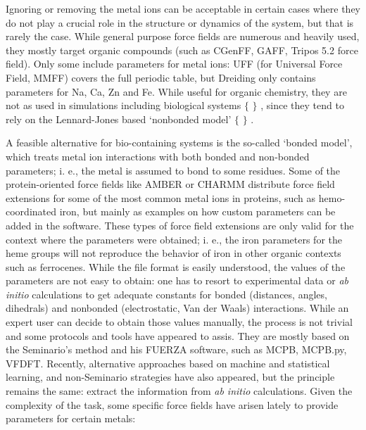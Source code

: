 Ignoring or removing the metal ions can be acceptable in certain cases where they do not play a crucial role in the structure or dynamics of the system, but that is rarely the case. While general purpose force fields are numerous and heavily used, they mostly target organic compounds (such as CGenFF,\cite{Vanommeslaeghe2009} GAFF,\cite{Wang2004} Tripos 5.2 force field\cite{clark1989}). Only some include parameters for metal ions: UFF (for Universal Force Field,\cite{rappe1992} MMFF\cite{halgren1996}) covers the full periodic table, but Dreiding\cite{Mayo1990} only contains parameters for Na, Ca, Zn and Fe. While useful for organic chemistry, they are not as used in simulations including biological systems $ \{ $ $ \} $ , since they tend to rely on the Lennard-Jones based ‘nonbonded model’ $ \{ $ $ \} $ .

A feasible alternative for bio-containing systems is the so-called ‘bonded model’, which treats metal ion interactions with both bonded and non-bonded parameters; i. e., the metal is assumed to bond to some residues. Some of the protein-oriented force fields like AMBER\cite{amber} or CHARMM\cite{charmm} distribute force field extensions for some of the most common metal ions in proteins, such as hemo-coordinated iron, but mainly as examples on how custom parameters can be added in the software. These types of force field extensions are only valid for the context where the parameters were obtained; i. e., the iron parameters for the heme groups will not reproduce the behavior of iron in other organic contexts such as ferrocenes. While the file format is easily understood, the values of the parameters are not easy to obtain: one has to resort to experimental data or \textit{ab initio} calculations to get adequate constants for bonded (distances, angles, dihedrals) and nonbonded (electrostatic, Van der Waals) interactions. While an expert user can decide to obtain those values manually, the process is not trivial and some protocols and tools have appeared to assis. They are mostly based on the Seminario’s method and his FUERZA software, \cite{Seminario1996} such as MCPB, MCPB.py,\cite{li2016} VFDFT.\cite{zheng2016} Recently, alternative approaches based on machine and statistical learning, \cite{fracchia2017,li2017b} and non-Seminario strategies\cite{Burger2012, allen2017} have also appeared, but the principle remains the same: extract the information from \textit{ab initio} calculations. Given the complexity of the task, some specific force fields have arisen lately to provide parameters for certain metals:

